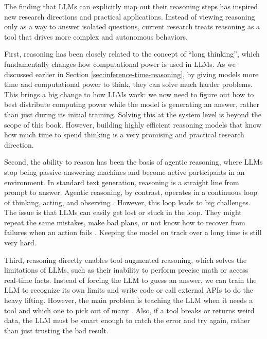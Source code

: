 The finding that LLMs can explicitly map out their reasoning steps has inspired new research directions and practical applications. Instead of viewing reasoning only as a way to answer isolated questions, current research treats reasoning as a tool that drives more complex and autonomous behaviors.

First, reasoning has been closely related to the concept of ``long thinking'', which fundamentally changes how computational power is used in LLMs. As we discussed earlier in Section \ref{sec:inference-time-reasoning}, by giving models more time and computational power to think, they can solve much harder problems. This brings a big change to how LLMs work: we now need to figure out how to best distribute computing power while the model is generating an answer, rather than just during its initial training. Solving this at the system level is beyond the scope of this book. However, building highly efficient reasoning models that know how much time to spend thinking is a very promising and practical research direction.

Second, the ability to reason has been the basis of agentic reasoning, where LLMs stop being passive answering machines and become active participants in an environment. In standard text generation, reasoning is a straight line from prompt to answer. Agentic reasoning, by contrast, operates in a continuous loop of thinking, acting, and observing \cite{yao-etal:2023react}. However, this loop leads to big challenges. The issue is that LLMs can easily get lost or stuck in the loop. They might repeat the same mistakes, make bad plans, or not know how to recover from failures when an action fails \cite{shinn-etal:2023reflexion}. Keeping the model on track over a long time is still very hard.

Third, reasoning directly enables tool-augmented reasoning, which solves the limitations of LLMs, such as their inability to perform precise math or access real-time facts. Instead of forcing the LLM to guess an answer, we can train the LLM to recognize its own limits and write code \cite{gao-etal:2023pal} or call external APIs \cite{schick-etal:2024toolformer} to do the heavy lifting. However, the main problem is teaching the LLM when it needs a tool and which one to pick out of many \cite{qin-etal:2024toolllm}. Also, if a tool breaks or returns weird data, the LLM must be smart enough to catch the error and try again, rather than just trusting the bad result.

